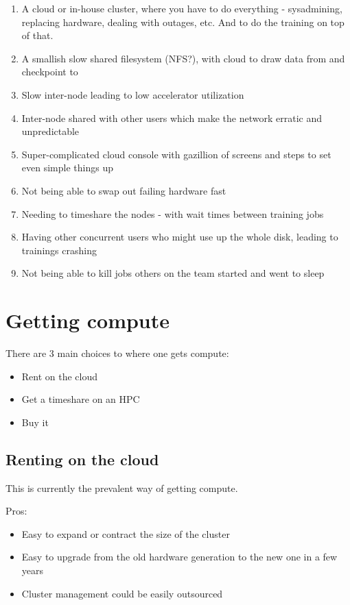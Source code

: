 \documentclass[
]{report}
\providecommand{\tightlist}{%
  \setlength{\itemsep}{0pt}\setlength{\parskip}{0pt}}\usepackage{longtable,booktabs,array}
\begin{document}
\begin{enumerate}
\def\labelenumi{\arabic{enumi}.}
\item
  A cloud or in-house cluster, where you have to do everything -
  sysadmining, replacing hardware, dealing with outages, etc. And to do
  the training on top of that.
\item
  A smallish slow shared filesystem (NFS?), with cloud to draw data from
  and checkpoint to
\item
  Slow inter-node leading to low accelerator utilization
\item
  Inter-node shared with other users which make the network erratic and
  unpredictable
\item
  Super-complicated cloud console with gazillion of screens and steps to
  set even simple things up
\item
  Not being able to swap out failing hardware fast
\item
  Needing to timeshare the nodes - with wait times between training jobs
\item
  Having other concurrent users who might use up the whole disk, leading
  to trainings crashing
\item
  Not being able to kill jobs others on the team started and went to
  sleep
\end{enumerate}

\section{Getting compute}\label{getting-compute}

There are 3 main choices to where one gets compute:

\begin{itemize}
\tightlist
\item
  Rent on the cloud
\item
  Get a timeshare on an HPC
\item
  Buy it
\end{itemize}

\subsection{Renting on the cloud}\label{renting-on-the-cloud}

This is currently the prevalent way of getting compute.

Pros:

\begin{itemize}
\tightlist
\item
  Easy to expand or contract the size of the cluster
\item
  Easy to upgrade from the old hardware generation to the new one in a
  few years
\item
  Cluster management could be easily outsourced
\end{itemize}
\end{document}

